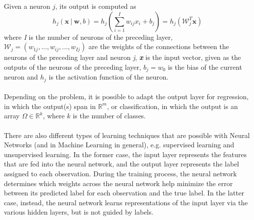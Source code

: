 Given a neuron $j$, its output is computed as
\begin{equation}
    h_j(\textbf{x}\ |\ \textbf{w}, b) = h_j\left(\sum_{i=1}^{I} w_{ij} x_i + b_j\right) = h_j(\mathcal{W}_j^T \textbf{x})
\end{equation}
where \textit{I} is the number of neurons of the preceding layer, $\mathcal{W}_j = (w_{1j}, ..., w_{ij}, ..., w_{Ij})$ are the weights of the connections between the neurons of the preceding layer and neuron \textit{j}, \textit{\textbf{x}} is the input vector, given as the outputs of the neurons of the preceding layer, $b_j = w_0$ is the bias of the current neuron and $h_j$ is the activation function of the neuron. 

\paragraph{}
Depending on the problem, it is possible to adapt the output layer for regression, in which the output(s) span in $\mathbb{R}^m$, or classification, in which the output is an array $\Omega \in \mathbb{R}^k$, where $k$ is the number of classes. 

\paragraph{}
There are also different types of learning techniques that are possible with Neural Networks (and in Machine Learning in general), e.g. supervised learning and unsupervised learning. \newline
In the former case, the input layer represents the features that are fed into the neural network, and the output layer represents the label assigned to each observation. During the training process, the neural network determines which weights across the neural network help minimize the error between its predicted label for each observation and the true label. \newline
In the latter case, instead, the neural network learns representations of the input layer via the various hidden layers, but is not guided by labels. 

